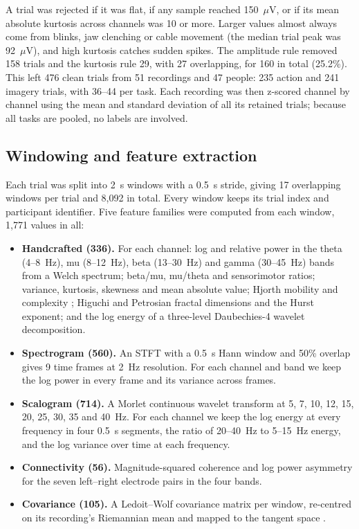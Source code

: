 \documentclass[pdflatex,sn-mathphys-num]{sn-jnl}%
\theoremstyle{thmstyleone}%
\theoremstyle{thmstyletwo}%
\theoremstyle{thmstylethree}%
\begin{document}
A trial was rejected if it was flat, if any sample reached 150~$\mu$V, or if its mean absolute kurtosis across channels was 10 or more. Larger values almost always come from blinks, jaw clenching or cable movement (the median trial peak was 92~$\mu$V), and high kurtosis catches sudden spikes. The amplitude rule removed 158 trials and the kurtosis rule 29, with 27 overlapping, for 160 in total (25.2\%). This left 476 clean trials from 51 recordings and 47 people: 235 action and 241 imagery trials, with 36--44 per task. Each recording was then z-scored channel by channel using the mean and standard deviation of all its retained trials; because all tasks are pooled, no labels are involved.

\subsection{Windowing and feature extraction}
Each trial was split into 2~s windows with a 0.5~s stride, giving 17 overlapping windows per trial and 8,092 in total. Every window keeps its trial index and participant identifier. Five feature families were computed from each window, 1,771 values in all:

\begin{itemize}
\item \textbf{Handcrafted (336).} For each channel: log and relative power in the theta (4--8~Hz), mu (8--12~Hz), beta (13--30~Hz) and gamma (30--45~Hz) bands from a Welch spectrum; beta/mu, mu/theta and sensorimotor ratios; variance, kurtosis, skewness and mean absolute value; Hjorth mobility and complexity \citep{Hjorth1970}; Higuchi \citep{Higuchi1988} and Petrosian fractal dimensions and the Hurst exponent; and the log energy of a three-level Daubechies-4 wavelet decomposition.
\item \textbf{Spectrogram (560).} An STFT with a 0.5~s Hann window and 50\% overlap gives 9 time frames at 2~Hz resolution. For each channel and band we keep the log power in every frame and its variance across frames.
\item \textbf{Scalogram (714).} A Morlet continuous wavelet transform at 5, 7, 10, 12, 15, 20, 25, 30, 35 and 40~Hz. For each channel we keep the log energy at every frequency in four 0.5~s segments, the ratio of 20--40~Hz to 5--15~Hz energy, and the log variance over time at each frequency.
\item \textbf{Connectivity (56).} Magnitude-squared coherence and log power asymmetry for the seven left--right electrode pairs in the four bands.
\item \textbf{Covariance (105).} A Ledoit--Wolf covariance matrix \citep{LedoitWolf2004} per window, re-centred on its recording's Riemannian mean \citep{Zanini2018} and mapped to the tangent space \citep{Barachant2012}.
\end{itemize}
\end{document}
